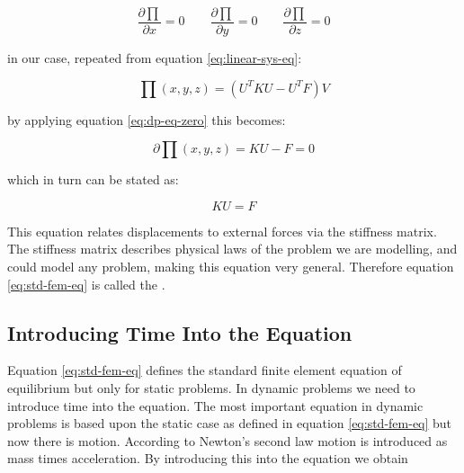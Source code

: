 

\begin{equation}
\label{eq:dp-eq-zero}
\frac{\partial \prod}{ \partial x} = 0
\qquad
\frac{\partial \prod}{ \partial y} = 0
\qquad
\frac{\partial \prod}{ \partial z} = 0
\end{equation}

in our case, repeated from equation \eqref{eq:linear-sys-eq}:

\begin{equation*}
\prod (x,y,z) = (U^T K U - U^T F) V
\end{equation*}

by applying equation \eqref{eq:dp-eq-zero} this becomes:

\begin{equation}
\partial \prod (x,y,z) = K U - F = 0
\end{equation}

which in turn can be stated as:

\begin{equation}
\label{eq:std-fem-eq}
K U = F
\end{equation}

This equation relates displacements to external forces via the
stiffness matrix. The stiffness matrix describes physical laws of the
problem we are modelling, and could model any
problem, making this equation very general. Therefore equation
\eqref{eq:std-fem-eq} is called the
.

\subsection{Introducing Time Into the Equation}
Equation \eqref{eq:std-fem-eq} defines the standard finite element
equation of equilibrium but only for static problems. In dynamic
problems we need to introduce time into the equation.
%
The most important equation in dynamic problems is based
upon the static case as defined in equation \eqref{eq:std-fem-eq} but now there
is motion. According to Newton's second law motion is introduced as mass times
acceleration. By introducing this into the equation we obtain 

